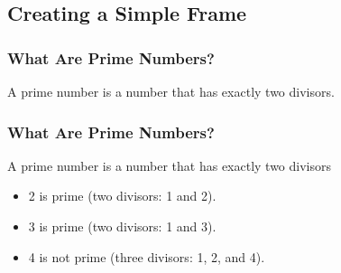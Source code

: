 \documentclass{beamer}
\begin{document}
\subsection{Creating a Simple Frame}
\begin{frame}
  \frametitle{What Are Prime Numbers?}
  A prime number is a number that has exactly two divisors.
\end{frame}
\begin{frame}
  \frametitle{What Are Prime Numbers?}
  \begin{definition}
    A \alert{prime number} is a number that has exactly two divisors
  \end{definition}
  \begin{example}
    \begin{itemize}
    \item 2 is prime (two divisors: 1 and 2).
    \item 3 is prime (two divisors: 1 and 3).
    \item 4 is not prime (\alert{three} divisors: 1, 2, and 4).
    \end{itemize}
  \end{example}
\end{frame}
\end{document}
